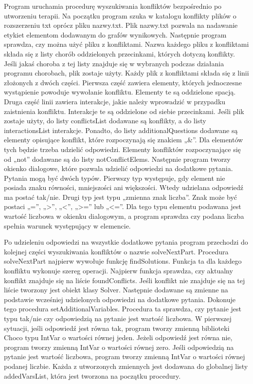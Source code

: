 \documentclass[oneside,a4paper]{book}
\begin{document}
\begin{spacing}{1.5}
Program uruchamia procedurę wyszukiwania konfliktów bezpośrednio po utworzeniu terapii. Na początku program szuka w katalogu konflikty plików o rozszerzeniu txt oprócz pliku nazwy.txt. Plik nazwy.txt pozwala na nadawanie etykiet elementom dodawanym do grafów wynikowych. Następnie program sprawdza, czy można użyć pliku z konfliktami. Nazwa każdego pliku z konfliktami składa się z listy chorób oddzielonych przecinkami, których dotyczą konflikty. Jeśli jakaś choroba z tej listy znajduje się w wybranych podczas działania programu chorobach, plik zostaje użyty. Każdy plik z konfliktami składa się z linii złożonych z dwóch części. Pierwsza część zawiera elementy, których jednoczesne wystąpienie powoduje wywołanie konfliktu. Elementy te są oddzielone spacją. Druga część linii zawiera interakcje, jakie należy wprowadzić w przypadku zaistnienia konfliktu. Interakcje te są oddzielone od siebie przecinkami. Jeśli plik zostaje użyty, do listy conflictsList dodawane są konflikty, a do listy interactionsList interakcje. Ponadto, do listy additionalQuestions dodawane są elementy opisujące konflikt, które rozpoczynają się znakiem „\&”. Dla elementów tych będzie trzeba udzielić odpowiedzi. Elementy konfliktów rozpoczynające się od „not” dodawane są do listy notConflictElems. Następnie program tworzy okienko dialogowe, które pozwala udzielić odpowiedzi na dodatkowe pytania. Pytania mogą być dwóch typów. Pierwszy typ występuje, gdy element nie posiada znaku równości, mniejszości ani większości. Wtedy udzielana odpowiedź ma postać tak/nie. Drugi typ jest typu „zmienna znak liczba”. Znak może być postaci „=”, „>”, „<”, „>=” lub „<=”. Dla tego typu elementu podawana jest wartość liczbowa w okienku dialogowym, a program sprawdza czy podana liczba spełnia warunek występujący w elemencie. 

Po udzieleniu odpowiedzi na wszystkie dodatkowe pytania program przechodzi do kolejnej części wyszukiwania konfliktów o nazwie solveNextPart. Procedura solveNextPart najpierw wywołuje funkcję findSolutions. Funkcja ta dla każdego konfliktu wykonuje szereg operacji. Najpierw funkcja sprawdza, czy aktualny konflikt znajduje się na liście foundConflicts. Jeśli konflikt nie znajduje się na tej liście tworzony jest obiekt klasy Solver. Następnie dodawane są zmienne na podstawie wcześniej udzielonych odpowiedzi na dodatkowe pytania. Dokonuje tego procedura setAdditionalVariables. Procedura ta sprawdza, czy pytanie jest typu tak/nie czy odpowiedzią na pytanie jest wartość liczbowa. W pierwszej sytuacji, jeśli odpowiedź jest równa tak, program tworzy zmienną biblioteki Choco typu IntVar o wartości równej jeden. Jeżeli odpowiedź jest równa nie, program tworzy zmienną IntVar o wartości równej zero. Jeśli odpowiedzią na pytanie jest wartość liczbowa, program tworzy zmienną IntVar o wartości równej podanej liczbie. Każda z utworzonych zmiennych jest dodawana do globalnej listy addedVarsList, która jest tworzona na początku procedury. 


\end{spacing}
\end{document}
